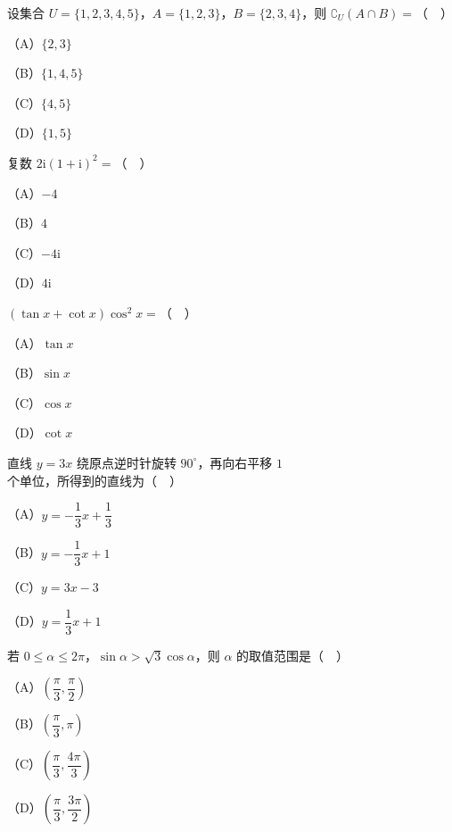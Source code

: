 


\begin{question}
设集合 $U=\{1,2,3,4,5\}$，$A=\{1,2,3\}$，$B=\{2,3,4\}$，则 $\complement_U(A\cap B)=$（　）

（A）$\{2,3\}$

（B）$\{1,4,5\}$

（C）$\{4,5\}$

（D）$\{1,5\}$

\end{question}
\begin{question}
复数 $2\mathrm i(1+\mathrm i)^2=$（　）

（A）$-4$

（B）$4$

（C）$-4\mathrm i$

（D）$4\mathrm i$

\end{question}
\begin{question}
$(\tan x+\cot x)\cos^2x=$（　）

（A）$\tan x$

（B）$\sin x$

（C）$\cos x$

（D）$\cot x$

\end{question}
\begin{question}
直线 $y=3x$ 绕原点逆时针旋转 $90^\circ$，再向右平移 $1$ 个单位，所得到的直线为（　）

（A）$y=-\dfrac13x+\dfrac13$

（B）$y=-\dfrac13x+1$

（C）$y=3x-3$

（D）$y=\dfrac13x+1$

\end{question}
\begin{question}
若 $0\leqslant\alpha\leqslant2\pi$，$\sin\alpha>\sqrt3\cos\alpha$，则 $\alpha$ 的取值范围是（　）

（A）$\left(\dfrac{\pi}3,\dfrac{\pi}2\right)$

（B）$\left(\dfrac{\pi}3,\pi\right)$

（C）$\left(\dfrac{\pi}3,\dfrac{4\pi}3\right)$

（D）$\left(\dfrac{\pi}3,\dfrac{3\pi}2\right)$

\end{question}
